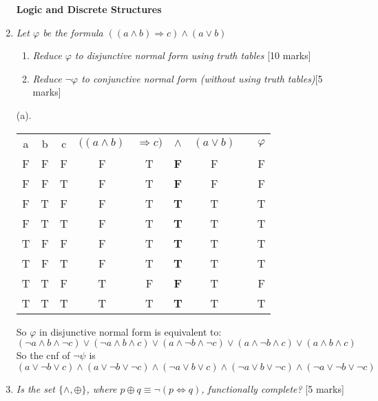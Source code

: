 \documentclass{article}[18pt]
\begin{document}
\begin{enumerate}
\newpage	
\begin{center}
	\textbf{\Large Logic and Discrete Structures}
\end{center}
	\item \textit{Let $\varphi$ be the formula $((a\land b)\Rightarrow c)\land (a\lor b)$}
	\begin{enumerate}
		\item \textit{Reduce $\varphi$ to disjunctive normal form using truth tables} \hfill [10 marks]
		\item\textit{ Reduce $\lnot \varphi$ to conjunctive normal form (without using truth tables)}\hfill [5 marks]
	\end{enumerate}
(a).\\
\begin{center}

{\renewcommand{\arraystretch}{1.2} 
\begin{tabular}{|c|c|c|c|c|c|c|cc}
	\cline{1-7}
	a & b & c & $((a\land b)$ & $\Rightarrow c)$ & $\land$ & $(a\lor b)$&&$\varphi$ \\ 
	\cline{1-7}
	F & F & F & F & T & \textbf{F} & F&&F \\  
	\cline{1-7}
	F & F & T & F & T & \textbf{F} & F&&F \\ 
	\cline{1-7} 
	F & T & F & F & T & \textbf{T} & T&&T \\ 
	\cline{1-7} 
	F & T & T & F & T & \textbf{T} & T&&T \\ 
	\cline{1-7}
	T & F & F & F & T & \textbf{T} & T&&T \\ 
	\cline{1-7} 
	T & F & T & F & T & \textbf{T} & T&&T \\ 
	\cline{1-7}
	T & T & F & T & F & \textbf{F} & T&&F \\ 
	\cline{1-7}
	T & T & T & T & T & \textbf{T} & T&&T \\ 
	\cline{1-7}
\end{tabular}}
\end{center}
So $\varphi$ in disjunctive normal form is equivalent to:
$$(\lnot a \land b \land \lnot c)\lor (\lnot a \land b \land c)\lor (a \land \lnot b \land \lnot c)\lor (a \land \lnot b \land c)\lor (a \land b \land c)$$
So the cnf of $\lnot \psi$ is 
$$(a \lor \lnot b \lor c)\land ( a \lor \lnot b \lor \lnot c)\land (\lnot a \lor  b \lor  c)\land (\lnot a \lor b \lor \lnot c)\land (\lnot a \lor \lnot b \lor \lnot c)$$


\item \textit{Is the set $\{\land,\oplus\}$, where $p\oplus q \equiv \lnot(p\Leftrightarrow q)$, functionally complete?} \hfill [5 marks]\\


\end{enumerate}
\end{document}
